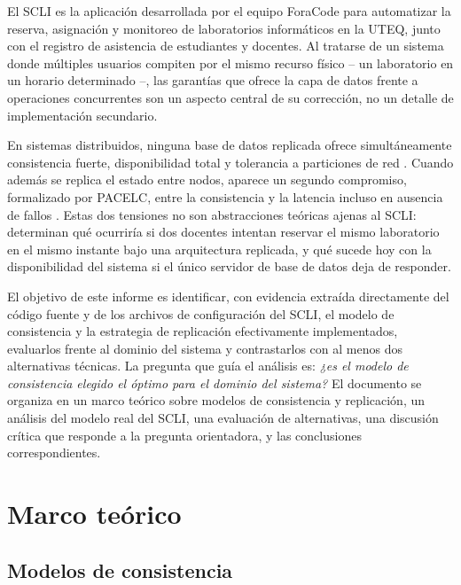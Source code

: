 \documentclass[conference]{IEEEtran}
\begin{document}
El SCLI es la aplicaci\'on desarrollada por el equipo ForaCode para automatizar la reserva, asignaci\'on y monitoreo de laboratorios inform\'aticos en la UTEQ, junto con el registro de asistencia de estudiantes y docentes. Al tratarse de un sistema donde m\'ultiples usuarios compiten por el mismo recurso f\'isico -- un laboratorio en un horario determinado --, las garant\'ias que ofrece la capa de datos frente a operaciones concurrentes son un aspecto central de su correcci\'on, no un detalle de implementaci\'on secundario.

En sistemas distribuidos, ninguna base de datos replicada ofrece simult\'aneamente consistencia fuerte, disponibilidad total y tolerancia a particiones de red \cite{gilbert2002}. Cuando adem\'as se replica el estado entre nodos, aparece un segundo compromiso, formalizado por PACELC, entre la consistencia y la latencia incluso en ausencia de fallos \cite{abadi2012}. Estas dos tensiones no son abstracciones te\'oricas ajenas al SCLI: determinan qu\'e ocurrir\'ia si dos docentes intentan reservar el mismo laboratorio en el mismo instante bajo una arquitectura replicada, y qu\'e sucede hoy con la disponibilidad del sistema si el \'unico servidor de base de datos deja de responder.

El objetivo de este informe es identificar, con evidencia extra\'ida directamente del c\'odigo fuente y de los archivos de configuraci\'on del SCLI, el modelo de consistencia y la estrategia de replicaci\'on efectivamente implementados, evaluarlos frente al dominio del sistema y contrastarlos con al menos dos alternativas t\'ecnicas. La pregunta que gu\'ia el an\'alisis es: \emph{¿es el modelo de consistencia elegido el \'optimo para el dominio del sistema?} El documento se organiza en un marco te\'orico sobre modelos de consistencia y replicaci\'on, un an\'alisis del modelo real del SCLI, una evaluaci\'on de alternativas, una discusi\'on cr\'itica que responde a la pregunta orientadora, y las conclusiones correspondientes.

\section{Marco te\'orico}

\subsection{Modelos de consistencia}
\end{document}
